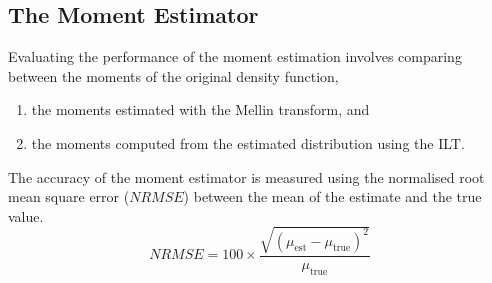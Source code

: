 \subsection{The Moment Estimator}
Evaluating the performance of the moment estimation involves comparing between the moments of the original density function, 
\begin{enumerate}
    \item the moments estimated with the Mellin transform, and
    \item the moments computed from the estimated distribution using the ILT.
\end{enumerate}
The accuracy of the moment estimator is measured using the normalised root mean square error ($NRMSE$) \cite{GruberT2Estimation2013} between the mean of the estimate and the true value.
\begin{equation}
    NRMSE = 100 \times
    \frac
    {\sqrt{(\mu_{\text{est}} - \mu_{\text{true}})^2}}
    {\mu_{\text{true}}}
    \label{eq:defnNRMSE}
\end{equation}

